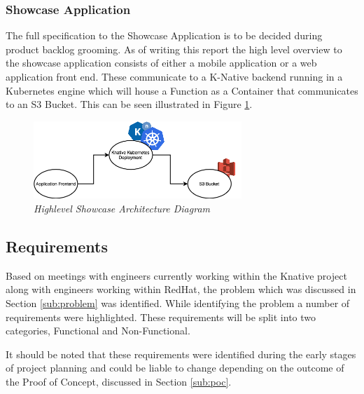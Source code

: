 \subsubsection{Showcase Application}
The full specification to the Showcase Application is to be decided during product backlog grooming. As of writing this report the high level overview to the showcase application consists of either a mobile application or a web application front end. These communicate to a K-Native backend running in a Kubernetes engine which will house a Function as a Container that communicates to an S3 Bucket. This can be seen illustrated in Figure \ref{img:showcase-arch}.

\begin{figure}[!ht]
\centering
\includegraphics*[width=0.7\textwidth]{images/showcase-app.png}
\caption{\em Highlevel Showcase Architecture Diagram}
\label{img:showcase-arch}
\end{figure}


\subsection{Requirements}
Based on meetings with engineers currently working within the Knative project along with engineers working within RedHat, the problem which was discussed in Section \ref{sub:problem} was identified. While identifying the problem a number of requirements were highlighted. These requirements will be split into two categories, Functional and Non-Functional. 

It should be noted that these requirements were identified during the early stages of project planning and could be liable to change depending on the outcome of the Proof of Concept, discussed in Section \ref{sub:poc}.

